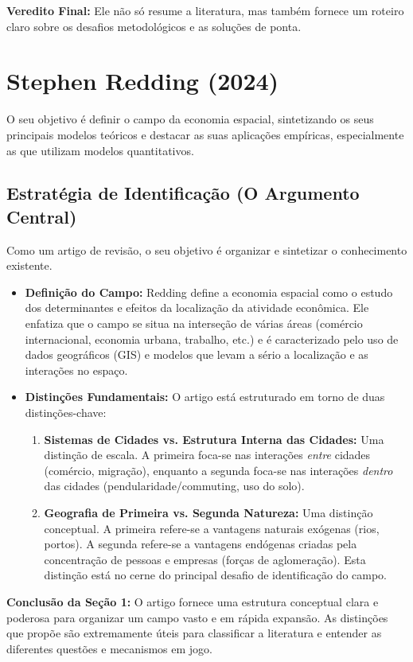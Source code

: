 \documentclass[12pt, a4paper]{article}
\begin{document}
\noindent\textbf{Veredito Final:}  Ele não só resume a literatura, mas também fornece um roteiro claro sobre os desafios metodológicos e as soluções de ponta.

\section{Stephen Redding (2024)}
 O seu objetivo é definir o campo da economia espacial, sintetizando os seus principais modelos teóricos e destacar as suas aplicações empíricas, especialmente as que utilizam modelos quantitativos.

\subsection{Estratégia de Identificação (O Argumento Central)}
Como um artigo de revisão, o seu objetivo é organizar e sintetizar o conhecimento existente.

\begin{itemize}
    \item \textbf{Definição do Campo:} Redding define a economia espacial como o estudo dos determinantes e efeitos da localização da atividade econômica. Ele enfatiza que o campo se situa na interseção de várias áreas (comércio internacional, economia urbana, trabalho, etc.) e é caracterizado pelo uso de dados geográficos (GIS) e modelos que levam a sério a localização e as interações no espaço.
    \item \textbf{Distinções Fundamentais:} O artigo está estruturado em torno de duas distinções-chave:
        \begin{enumerate}
            \item \textbf{Sistemas de Cidades vs. Estrutura Interna das Cidades:} Uma distinção de escala. A primeira foca-se nas interações \textit{entre} cidades (comércio, migração), enquanto a segunda foca-se nas interações \textit{dentro} das cidades (pendularidade/commuting, uso do solo).
            \item \textbf{Geografia de Primeira vs. Segunda Natureza:} Uma distinção conceptual. A primeira refere-se a vantagens naturais exógenas (rios, portos). A segunda refere-se a vantagens endógenas criadas pela concentração de pessoas e empresas (forças de aglomeração). Esta distinção está no cerne do principal desafio de identificação do campo.
        \end{enumerate}
\end{itemize}

\noindent\textbf{Conclusão da Seção 1:} O artigo fornece uma estrutura conceptual clara e poderosa para organizar um campo vasto e em rápida expansão. As distinções que propõe são extremamente úteis para classificar a literatura e entender as diferentes questões e mecanismos em jogo.
\end{document}
